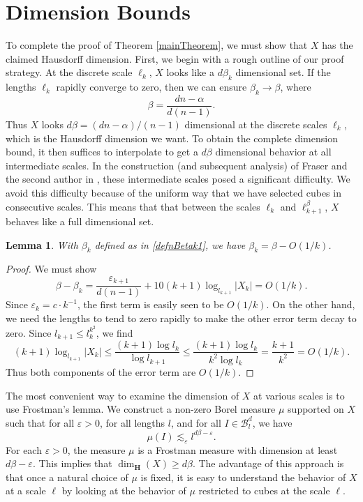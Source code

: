 \documentclass[usenames,dvipsnames,letterpaper, reqno,11pt]{article}
\theoremstyle{plain}
\newtheorem{lemma}{Lemma}
\theoremstyle{plain}
\begin{document}
\section{Dimension Bounds}\label{dimensionBoundSection}

To complete the proof of Theorem \ref{mainTheorem}, we must show that $X$ has the claimed Hausdorff dimension. First, we begin with a rough outline of our proof strategy. At the discrete scale $\ell_k$, $X$ looks like a $d \beta_k$ dimensional set. If the lengths $\ell_k$ rapidly converge to zero, then we can ensure $\beta_k \to \beta$, where
%
\[ \beta = \frac{dn - \alpha}{d(n - 1)}. \]
%
Thus $X$ looks $d \beta = (dn - \alpha) / (n-1)$ dimensional at the discrete scales $\ell_k$, which is the Hausdorff dimension we want. To obtain the complete dimension bound, it then suffices to interpolate to get a $d\beta$ dimensional behavior at all intermediate scales. In the construction (and subsequent analysis) of Fraser and the second author in \cite{MalabikaRob}, these intermediate scales posed a significant difficulty. We avoid this difficulty because of the uniform way that we have selected cubes in consecutive scales. This means that that between the scales $\ell_k$ and $\ell_{k+1}^\beta$, $X$ behaves like a full dimensional set.

\begin{lemma} With $\beta_k$ defined as in \eqref{defnBetak1}, we have
	$\beta_k = \beta - O(1/k)$.
\end{lemma}
\begin{proof}
	We must show
	\[ \beta - \beta_k = \frac{\varepsilon_{k+1}}{d(n-1)} + 10(k+1) \log_{l_{k+1}} |X_k| = O(1/k). \]
	Since $\varepsilon_k = c \cdot k^{-1}$, the first term is easily seen to be $O(1/k)$. On the other hand, we need the lengths to tend to zero rapidly to make the other error term decay to zero. Since $l_{k+1} \leq l_k^{k^2}$, we find
	\[ (k+1) \log_{l_{k+1}} |X_k| \leq \frac{(k+1) \log l_k}{\log l_{k+1}} \leq \frac{(k+1) \log l_k}{k^2 \log l_k} = \frac{k+1}{k^2} = O(1/k). \]
	Thus both components of the error term are $O(1/k)$.
\end{proof}

The most convenient way to examine the dimension of $X$ at various scales is to use Frostman's lemma. We construct a non-zero Borel measure $\mu$ supported on $X$ such that for all $\varepsilon > 0$, for all lengths $l$, and for all $I \in \mathcal{B}^d_l$, we have 
$$
\mu(I) \lesssim_\varepsilon l^{d\beta - \varepsilon}.
$$ 
For each $\varepsilon>0$, the measure $\mu$ is a Frostman measure with dimension at least $d\beta - \varepsilon$. This implies that $\dim_{\mathbf{H}}(X) \geq d \beta$. The advantage of this approach is that once a natural choice of $\mu$ is fixed, it is easy to understand the behavior of $X$ at a scale $\ell$ by looking at the behavior of $\mu$ restricted to cubes at the scale $\ell$.
\end{document}
